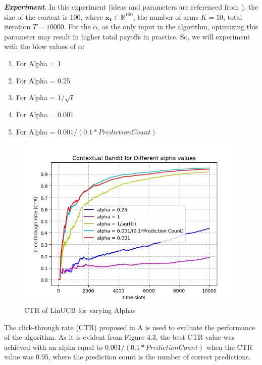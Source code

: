 \textbf{\textit{Experiment}}. In this experiment (ideas and parameters are referenced from \cite{experiment}), the size of the context is 100, where $\mathbf{x_{t}}\in \mathbb{R}^{100}$, the number of arms $K=10$, total iteration $T=10000$. For the $\alpha$, as the only input in the algorithm, optimizing this parameter may result in higher total payoffs in practice. So, we will experiment with the blow values of $\alpha$:
\begin{enumerate}
   
    \item For Alpha = 1
     \item For Alpha = 0.25
    \item For Alpha = ${1}/{\sqrt{t}}$
    \item For Alpha = 0.001
    \item For Alpha = $0.001/(0.1 * Prediction Count)$
    
\end{enumerate}
\begin{figure}[htbp]
    \centering
    \includegraphics[scale =0.7]{figure/F5.png}
    \caption{CTR of LinUCB for varying Alphas}
    \end{figure}
The click-through rate (CTR) proposed in A is used to evaluate the performance of the algorithm. As it is evident from Figure 4.3, the best CTR value was achieved with an alpha equal to $0.001/(0.1 * Prediction Count)$ when the CTR value was 0.95, where the prediction count is the number of correct predictions.

